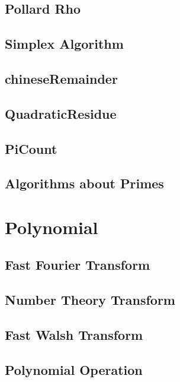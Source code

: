 \subsection{Pollard Rho}

\subsection{Simplex Algorithm}

\subsection{chineseRemainder}

\subsection{QuadraticResidue}

\subsection{PiCount}

\subsection{Algorithms about Primes}



\section{Polynomial}
\subsection{Fast Fourier Transform}

\subsection{Number Theory Transform}

\subsection{Fast Walsh Transform}

\subsection{Polynomial Operation}



